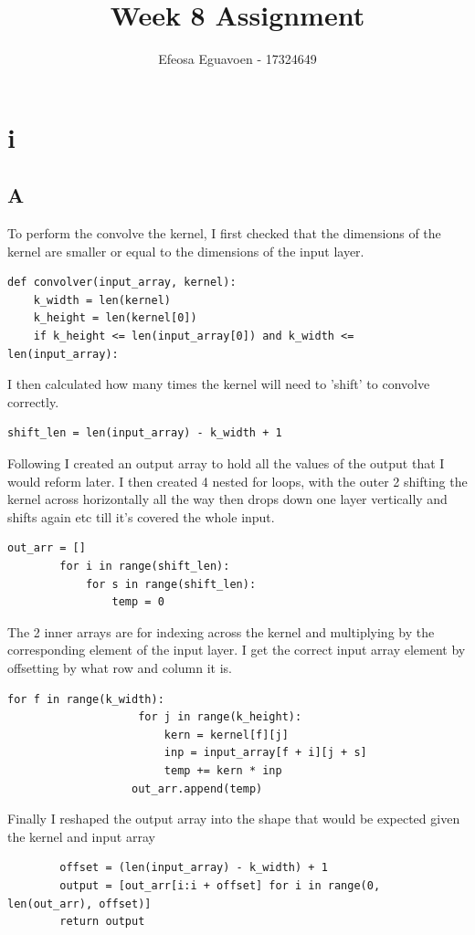 \documentclass[11pt]{article} %
\title{Week 8 Assignment}
\author{Efeosa Eguavoen - 17324649}
\begin{document}
\maketitle

\section{i}
\subsection{A}
To perform the convolve the kernel, I first checked that the dimensions of the kernel are smaller or equal to the dimensions of the input layer.
\begin{verbatim}
def convolver(input_array, kernel):
    k_width = len(kernel)
    k_height = len(kernel[0])
    if k_height <= len(input_array[0]) and k_width <= len(input_array):
\end{verbatim}
I then calculated how many times the kernel will need to 'shift' to convolve correctly.  \begin{verbatim}
shift_len = len(input_array) - k_width + 1
\end{verbatim}
Following I created an output array to hold all the values of the output that I would reform later.  I then created 4 nested for loops, with the outer 2 shifting the kernel across horizontally all the way then drops down one layer vertically and shifts again etc till it's covered the whole input.  
\begin{verbatim}
out_arr = []
        for i in range(shift_len):
            for s in range(shift_len):
                temp = 0
\end{verbatim}
The 2 inner arrays are for indexing across the kernel and multiplying by the corresponding element of the input layer.  I get the correct input array element by offsetting by what row and column it is. \begin{verbatim}
for f in range(k_width):
                    for j in range(k_height):
                        kern = kernel[f][j]
                        inp = input_array[f + i][j + s]
                        temp += kern * inp
                   out_arr.append(temp)
\end{verbatim}
Finally I reshaped the output array into the shape that would be expected given the kernel and input array \begin{verbatim}
	    offset = (len(input_array) - k_width) + 1
        output = [out_arr[i:i + offset] for i in range(0, len(out_arr), offset)]
        return output
\end{verbatim}
\end{document}
